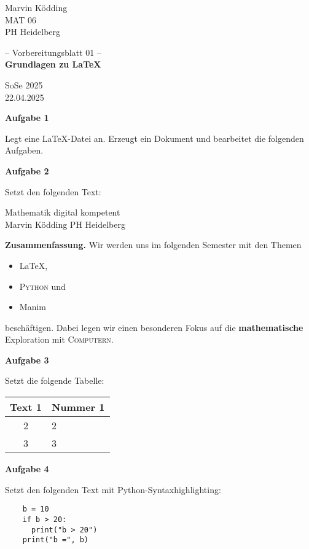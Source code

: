 \documentclass[a4paper, 12pt]{article}
\begin{document}
	\pagestyle{empty}
	\begin{minipage}{0.2\textwidth}
		Marvin Ködding\\\scriptsize MAT 06\\PH Heidelberg
	\end{minipage}
	\begin{minipage}{.6\textwidth}
		\centering
		-- Vorbereitungsblatt 01 --\\\textbf{Grundlagen zu \LaTeX}
	\end{minipage}
	\begin{minipage}{.2\textwidth}
		\flushright SoSe 2025\\\scriptsize 22.04.2025
	\end{minipage}
	
	\vspace*{1cm}
	
	\textbf{Aufgabe 1}
	
	Legt eine \LaTeX-Datei an. Erzeugt ein Dokument und bearbeitet die folgenden Aufgaben.
	
	\vspace*{0.4cm}
	
	\textbf{Aufgabe 2}
	
		Setzt den folgenden Text:
		
		\begin{center}
			Mathematik digital kompetent\\
			\tiny Marvin Ködding \qquad PH Heidelberg
		\end{center}
		
		\textbf{Zusammenfassung.} Wir werden uns im folgenden Semester mit den Themen
		\begin{itemize}
			\item \LaTeX,
			\item \textsc{Python} und
			\item \glqq{}Manim\grqq{}
		\end{itemize}
		beschäftigen. Dabei legen wir einen besonderen Fokus auf die \textbf{mathematische} Exploration mit \textsc{Computern}.
		
	\vspace*{0.4cm}
	
	\textbf{Aufgabe 3}
	
		Setzt die folgende Tabelle:
		
		\begin{center}
			\begin{tabular}{c|l}
				Text 1 & Nummer 1\\
				\hline
				2 & 2\\
				\hline
				3 & 3
			\end{tabular}
		\end{center}
		
	\vspace*{0.4cm}

	\textbf{Aufgabe 4}
	
		Setzt den folgenden Text mit Python-Syntaxhighlighting:
		
		\begin{verbatim}
	b = 10
	if b > 20:
	  print("b > 20")
	print("b =", b)
		\end{verbatim}
\end{document}
